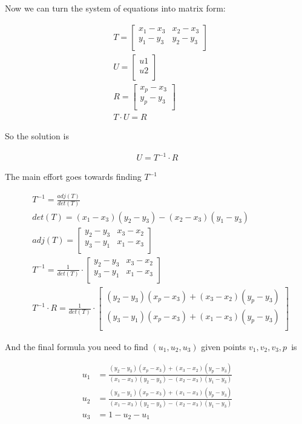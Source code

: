 \documentclass{article}
\begin{document}
Now we can turn the system of equations into matrix form:

\begin{align}
  & T =
  \begin{bmatrix}
    x_1 - x_3 & x_2 - x_3 \\
    y_1 - y_3 & y_2 - y_3 \\
  \end{bmatrix} \\
  & U = \begin{bmatrix}
    u1 \\ u2 \\
  \end{bmatrix}\\
  & R = \begin{bmatrix}
    x_p - x_3 \\
    y_p - y_3 \\
  \end{bmatrix} \\
  & T \cdot U = R
\end{align}

So the solution is

\begin{align}
  U = T^{-1} \cdot R
\end{align}

The main effort goes towards finding $T^{-1}$

\begin{align}
  & T^{-1} = \frac{adj(T)}{det(T)} \\
  & det(T) = (x_1 - x_3)(y_2 - y_3) - (x_2 - x_3)(y_1 - y_3) \\
  & adj(T) = \begin{bmatrix}
    y_2 - y_3 & x_3 - x_2 \\
    y_3 - y_1 & x_1 - x_3 \\
  \end{bmatrix} \\
  & T^{-1} = \frac{1}{det(T)} \cdot \begin{bmatrix}
    y_2 - y_3 & x_3 - x_2 \\
    y_3 - y_1 & x_1 - x_3 \\
  \end{bmatrix} \\
  & T^{-1}\cdot R = \frac{1}{det(T)} \cdot \begin{bmatrix}
    (y_2 - y_3)(x_p - x_3) + (x_3 - x_2)(y_p - y_3) \\
    (y_3 - y_1)(x_p - x_3) + (x_1 - x_3)(y_p - y_3) \\
  \end{bmatrix}
\end{align}

And the final formula you need to find $(u_1, u_2, u_3)$ given points $v_1, v_2, v_3, p$~is

\begin{align}
  u_1 &= \frac{(y_2 - y_3)(x_p - x_3) + (x_3 - x_2)(y_p - y_3)}{(x_1 - x_3)(y_2 - y_3) - (x_2 - x_3)(y_1 - y_3)} \\
  u_2 &= \frac{(y_3 - y_1)(x_p - x_3) + (x_1 - x_3)(y_p - y_3)}{(x_1 - x_3)(y_2 - y_3) - (x_2 - x_3)(y_1 - y_3)} \\
  u_3 &= 1 - u_2 - u_1
\end{align}
\end{document}
